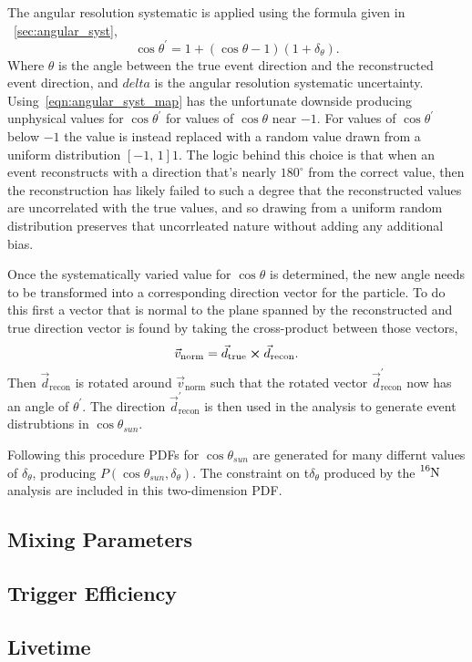 The angular resolution systematic is applied using the formula given in
~\ref{sec:angular_syst},
\begin{equation}
    \cos\theta^{\prime} = 1 + (\cos\theta - 1)(1+\delta_{\theta})\text{.}
    \label{eqn:angular_syst_map}
\end{equation}
Where $\theta$ is the angle between the true event direction and the reconstructed
event direction, and $delta$ is the angular resolution systematic uncertainty.
Using~\eqref{eqn:angular_syst_map} has the unfortunate downside producing
unphysical values for $\cos\theta^{\prime}$ for values of $\cos\theta$ near
$-1$. For values of $\cos\theta^{\prime}$ below $-1$ the value is instead replaced
with a random value drawn from a uniform distribution $\left[-1\text{, }1\right]1$.
The logic behind this choice is that when an event reconstructs with a direction
that's nearly $180^{\circ}$ from the correct value, then the reconstruction
has likely failed to such a degree that the reconstructed values are uncorrelated
with the true values, and so drawing from a uniform random distribution preserves
that uncorrleated nature without adding any additional bias.

Once the systematically varied value for $\cos\theta$ is determined, the new angle
needs to be transformed into a corresponding direction vector for the particle.
To do this first a vector that is normal to the plane spanned by the reconstructed
and true direction vector is found by taking the cross-product between those vectors,
\begin{equation}
    \vec{v}_{\mathrm{norm}} = \vec{d}_{\mathrm{true}} \cross \vec{d}_{\mathrm{recon}}\text{.}
\end{equation}
Then $\vec{d}_{\mathrm{recon}}$ is rotated around $\vec{v}_{\mathrm{norm}}$
such that the rotated vector $\vec{d}^{\prime}_{\mathrm{recon}}$ now has an angle
of $\theta^{\prime}$.
The direction $\vec{d}^{\prime}_{\mathrm{recon}}$ is then used in the
analysis to generate event distrubtions in $\cos\theta_{sun}$.

Following this procedure PDFs for $\cos\theta_{sun}$ are generated for many differnt
values of $\delta_{\theta}$, producing $P(\cos\theta_{sun}, \delta_{\theta})$.
The constraint on t$\delta_{\theta}$ produced by the $\ce{^{16}N}$ analysis
are included in this two-dimension PDF\@.

\subsection{Mixing Parameters}
\subsection{Trigger Efficiency}
\subsection{Livetime}

